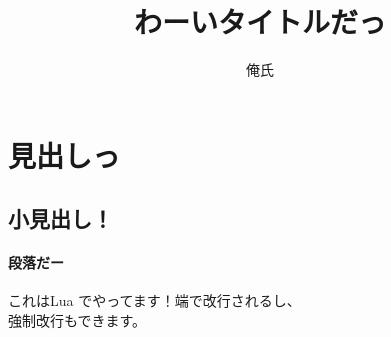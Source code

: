 \documentclass{ltjsarticle}
\begin{document}
\title{わーいタイトルだっ\mathrm{\LaTeX} }
\author{俺氏}
\maketitle
\section{見出しっ}
\subsection{小見出し！}
\paragraph{段落だー}
これはLua\mathrm{\LaTeX} でやってます！端で改行されるし、\\
強制改行もできます。
\end{document}
